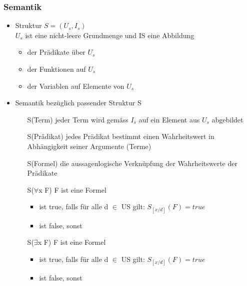 \documentclass[a4paper,10pt]{article}
\begin{document}
\subsubsection{Semantik}
\begin{itemize}
	\item Struktur $S = (U_s, I_s)$ \\
		$U_s$ ist eine nicht-leere Grundmenge und IS eine Abbildung
		\begin{itemize}
			\item der Pr\"adikate \"uber $U_s$
			\item der Funktionen auf $U_s$
			\item der Variablen auf Elemente von $U_s$
		\end{itemize}
	\item Semantik bez\"uglich passender Struktur S
		\begin{itemize}
			\item[S(Term)] jeder Term wird gem\"ass $I_s$ auf ein Element aus $U_s$ abgebildet
			\item[S(Pr\"adikat)] jedes Pr\"adikat bestimmt einen Wahrheitswert in Abh\"angigkeit seiner Argumente (Terme)
			\item[S(Formel)] die aussagenlogische Verkn\"upfung der Wahrheitswerte der Pr\"adikate
			\item[S($\forall$x F)] F ist eine Formel 
				\begin{itemize}
					\item ist true, falls f\"ur alle d $\in$ US gilt: $S_{[x/d]}(F) = true$
					\item ist false, sonst
				\end{itemize}
			\item[S($\exists$x F)] F ist eine Formel
				\begin{itemize}
					\item ist true, falls f\"ur alle d $\in$ US gilt: $S_{[x/d]}(F) = true$
					\item ist false, sonst
				\end{itemize}
		\end{itemize}
\end{itemize}
\end{document}
